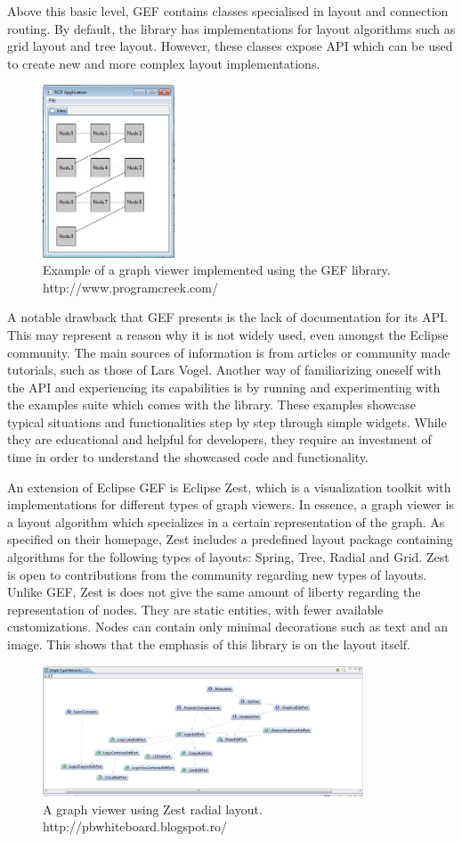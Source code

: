 Above this basic level, GEF contains classes specialised in layout and connection routing. By default, the library has implementations for 
layout algorithms such as grid layout and tree layout. However, these classes expose API which can be used to create new and more complex 
layout implementations.

\begin{figure}[ht] \centering
\includegraphics[width=0.35\textwidth]{img/relatedwork/gefexample.jpg}
\caption{Example of a graph viewer implemented using the GEF library. http://www.programcreek.com/} \end{figure}

A notable drawback that GEF presents is the lack of documentation for its API. This may represent a reason why it is not widely 
used, even amongst the Eclipse community. The main sources of information is from articles or community made tutorials, such as 
those of Lars Vogel. Another way of familiarizing oneself with the API and experiencing its capabilities is by running and experimenting 
with the examples suite which comes with the library. These examples showcase typical situations and functionalities step by step through 
simple widgets. While they are educational and helpful for developers, they require an investment of time in order to understand 
the showcased code and functionality.

An extension of Eclipse GEF is Eclipse Zest, which is a visualization toolkit with implementations for different types of graph 
viewers. In essence, a graph viewer is a layout algorithm which specializes in a certain representation of the graph. As 
specified on their homepage, Zest includes a predefined layout package containing algorithms for the following types of 
layouts: Spring, Tree, Radial and Grid. Zest is open to contributions from the community regarding new types of layouts.
Unlike GEF, Zest is does not give the same amount of liberty regarding the representation of nodes. They are static entities, with 
fewer available customizations. Nodes can contain only minimal decorations such as text and an image. This shows that the emphasis 
of this library is on the layout itself.

\begin{figure}[ht] \centering
\includegraphics[width=0.85\textwidth]{img/relatedwork/zest.png}
\caption{A graph viewer using Zest radial layout. http://pbwhiteboard.blogspot.ro/} \end{figure}
